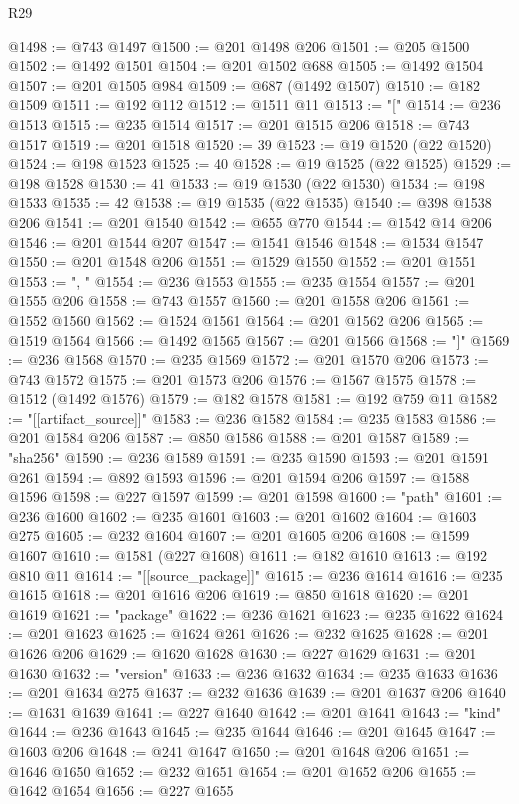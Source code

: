 \begin{lexlean}{R29}
\begin{coremodule}
@1498 := @743 @1497
@1500 := @201 @1498 @206
@1501 := @205 @1500
@1502 := @1492 @1501
@1504 := @201 @1502 @688
@1505 := @1492 @1504
@1507 := @201 @1505 @984
@1509 := @687 (@1492 @1507)
@1510 := @182 @1509
@1511 := @192 @112
@1512 := @1511 @11
@1513 := "["
@1514 := @236 @1513
@1515 := @235 @1514
@1517 := @201 @1515 @206
@1518 := @743 @1517
@1519 := @201 @1518
@1520 := 39
@1523 := @19 @1520 (@22 @1520)
@1524 := @198 @1523
@1525 := 40
@1528 := @19 @1525 (@22 @1525)
@1529 := @198 @1528
@1530 := 41
@1533 := @19 @1530 (@22 @1530)
@1534 := @198 @1533
@1535 := 42
@1538 := @19 @1535 (@22 @1535)
@1540 := @398 @1538 @206
@1541 := @201 @1540
@1542 := @655 @770
@1544 := @1542 @14 @206
@1546 := @201 @1544 @207
@1547 := @1541 @1546
@1548 := @1534 @1547
@1550 := @201 @1548 @206
@1551 := @1529 @1550
@1552 := @201 @1551
@1553 := ", "
@1554 := @236 @1553
@1555 := @235 @1554
@1557 := @201 @1555 @206
@1558 := @743 @1557
@1560 := @201 @1558 @206
@1561 := @1552 @1560
@1562 := @1524 @1561
@1564 := @201 @1562 @206
@1565 := @1519 @1564
@1566 := @1492 @1565
@1567 := @201 @1566
@1568 := "]"
@1569 := @236 @1568
@1570 := @235 @1569
@1572 := @201 @1570 @206
@1573 := @743 @1572
@1575 := @201 @1573 @206
@1576 := @1567 @1575
@1578 := @1512 (@1492 @1576)
@1579 := @182 @1578
@1581 := @192 @759 @11
@1582 := "[[artifact_source]]"
@1583 := @236 @1582
@1584 := @235 @1583
@1586 := @201 @1584 @206
@1587 := @850 @1586
@1588 := @201 @1587
@1589 := "sha256"
@1590 := @236 @1589
@1591 := @235 @1590
@1593 := @201 @1591 @261
@1594 := @892 @1593
@1596 := @201 @1594 @206
@1597 := @1588 @1596
@1598 := @227 @1597
@1599 := @201 @1598
@1600 := "path"
@1601 := @236 @1600
@1602 := @235 @1601
@1603 := @201 @1602
@1604 := @1603 @275
@1605 := @232 @1604
@1607 := @201 @1605 @206
@1608 := @1599 @1607
@1610 := @1581 (@227 @1608)
@1611 := @182 @1610
@1613 := @192 @810 @11
@1614 := "[[source_package]]"
@1615 := @236 @1614
@1616 := @235 @1615
@1618 := @201 @1616 @206
@1619 := @850 @1618
@1620 := @201 @1619
@1621 := "package"
@1622 := @236 @1621
@1623 := @235 @1622
@1624 := @201 @1623
@1625 := @1624 @261
@1626 := @232 @1625
@1628 := @201 @1626 @206
@1629 := @1620 @1628
@1630 := @227 @1629
@1631 := @201 @1630
@1632 := "version"
@1633 := @236 @1632
@1634 := @235 @1633
@1636 := @201 @1634 @275
@1637 := @232 @1636
@1639 := @201 @1637 @206
@1640 := @1631 @1639
@1641 := @227 @1640
@1642 := @201 @1641
@1643 := "kind"
@1644 := @236 @1643
@1645 := @235 @1644
@1646 := @201 @1645
@1647 := @1603 @206
@1648 := @241 @1647
@1650 := @201 @1648 @206
@1651 := @1646 @1650
@1652 := @232 @1651
@1654 := @201 @1652 @206
@1655 := @1642 @1654
@1656 := @227 @1655

\end{coremodule}
\end{lexlean}
